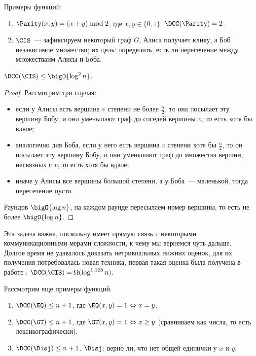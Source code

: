 Примеры функций:
\begin{enumerate}
    \item $\Parity(x, y) = (x + y) \bmod 2$, где $x, y \in \{0, 1\}$. $\DCC(\Parity) = 2$.
    \item $\CIS$~--- зафиксируем некоторый граф $G$, Алиса получает клику, а Боб независимое множество;
        их цель: определить, есть ли пересечение между множестваим Алисы и Боба.
\end{enumerate}

\begin{theorem}
    $\DCC(\CIS) \le \bigO{\log^2 n}$.
\end{theorem}

\begin{proof}
    Рассмотрим три случая:
    \begin{itemize}
        \item если у Алисы есть вершина $v$ степени не более $\frac{n}{2}$, то она посылает эту вершину
            Бобу, и они уменьшают граф до соседей вершины $v$, то есть хотя бы вдвое;
        \item аналогично для Боба, если у него есть вершина $v$ степени хотя бы $\frac{n}{2}$, то он
            посылает эту вершину Бобу, и они уменьшают граф до множества вершин, несвязных с $v$, то есть
            хотя бы вдвое;
        \item иначе у Алисы все вершины большой степени, а у Боба~--- маленькой, тогда пересечение пусто.
    \end{itemize}

    Раундов $\bigO{\log n}$, на каждом раунде пересылаем номер вершины, то есть не более $\bigO{\log n}$.
\end{proof}


Эта задача важна, поскольну имеет прямую связь с некоторыми коммуникационными мерами сложности, к чему мы
вернемся чуть дальше. Долгое время не удавалось доказать нетривиальных нижних оценок, для их получения
потребовалась новая техника, первая такая оценка была получена в работе \cite{Goos15-CIS}: $\DCC(\CIS) =
\Omega(\log^{1.128} n)$.

Рассмотрим еще примеры функций.
\begin{enumerate}
    \item $\DCC(\EQ) \le n + 1$, где $\EQ(x, y) = 1 \Leftrightarrow x = y$.
    \item $\DCC(\GT) \le n + 1$, где $\GT(x, y) = 1 \Leftrightarrow x \ge y$ (сравниваем как числа, то
        есть лексикографически).
    \item $\DCC(\Disj) \le n + 1$. $\Disj$: верно ли, что нет общей единички у $x$ и $y$.
\end{enumerate}

